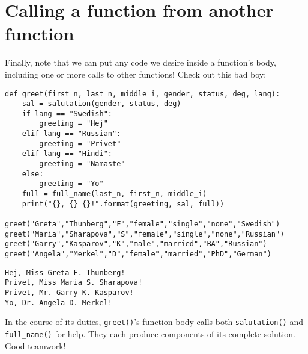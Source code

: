 \section{Calling a function from another function}

Finally, note that we can put any code we desire inside a function's body,
including one or more calls to other functions! Check out this bad boy:


\begin{Verbatim}[fontsize=\footnotesize,samepage=true,frame=single,framesep=3mm]
def greet(first_n, last_n, middle_i, gender, status, deg, lang):
    sal = salutation(gender, status, deg)
    if lang == "Swedish":
        greeting = "Hej"
    elif lang == "Russian":
        greeting = "Privet"
    elif lang == "Hindi":
        greeting = "Namaste"
    else:
        greeting = "Yo"
    full = full_name(last_n, first_n, middle_i)
    print("{}, {} {}!".format(greeting, sal, full))

greet("Greta","Thunberg","F","female","single","none","Swedish")
greet("Maria","Sharapova","S","female","single","none","Russian")
greet("Garry","Kasparov","K","male","married","BA","Russian")
greet("Angela","Merkel","D","female","married","PhD","German")
\end{Verbatim}
\vspace{-.2in}

\begin{Verbatim}[fontsize=\small,samepage=true,frame=leftline,framesep=5mm,framerule=1mm]
Hej, Miss Greta F. Thunberg!
Privet, Miss Maria S. Sharapova!
Privet, Mr. Garry K. Kasparov!
Yo, Dr. Angela D. Merkel!
\end{Verbatim}

In the course of its duties, \texttt{greet()}'s function body calls both
\texttt{salutation()} and \texttt{full\_name()} for help. They each produce
components of its complete solution. Good teamwork!


